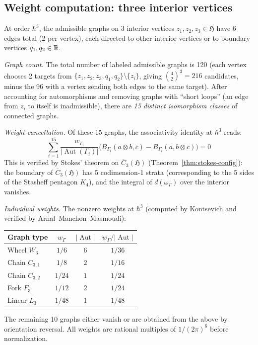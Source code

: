 \subsection{Weight computation: three interior vertices}
\label{subsec:kontsevich-3vertex}

\begin{computation}
\label{comp:kontsevich-3vertex}

At order $\hbar^3$, the admissible graphs on 3 interior vertices
$z_1, z_2, z_3 \in \mathfrak{H}$ have 6 edges total (2 per vertex),
each directed to other interior vertices or to boundary vertices
$q_1, q_2 \in \mathbb{R}$.

\emph{Graph count.}
The total number of labeled admissible graphs is 120 (each vertex
chooses 2 targets from $\{z_1, z_2, z_3, q_1, q_2\}
\setminus \{z_i\}$, giving $\binom{4}{2}^3 = 216$ candidates,
minus the 96 with a vertex sending both edges to the same target).
After accounting for automorphisms and removing graphs with
``short loops'' (an edge from $z_i$ to itself is inadmissible),
there are \emph{15 distinct isomorphism classes} of connected graphs.

\emph{Weight cancellation.}
Of these 15 graphs, the associativity identity at $\hbar^3$ reads:
\begin{equation}\label{eq:hbar3-assoc}
\sum_{i=1}^{15}
\frac{w_{\Gamma_i}}{|\operatorname{Aut}(\Gamma_i)|}
\bigl(B_{\Gamma_i}(a \otimes b, c)
- B_{\Gamma_i}(a, b \otimes c)\bigr) = 0
\end{equation}
This is verified by Stokes' theorem on $\overline{C}_3(\mathfrak{H})$
(Theorem~\ref{thm:stokes-config}): the boundary of
$\overline{C}_3(\mathfrak{H})$ has 5 codimension-1 strata
(corresponding to the 5 sides of the Stasheff pentagon $K_4$),
and the integral of $d(\omega_\Gamma)$ over the interior vanishes.

\emph{Individual weights.}
The nonzero weights at $\hbar^3$ (computed by Kontsevich and
verified by Arnal--Manchon--Masmoudi):
\begin{center}
\renewcommand{\arraystretch}{1.2}
\begin{tabular}{l|ccc}
Graph type & $w_\Gamma$ & $|\operatorname{Aut}|$ &
$w_\Gamma/|\operatorname{Aut}|$ \\
\hline
Wheel $W_3$ & $1/6$ & $6$ & $1/36$ \\
Chain $C_{3,1}$ & $1/8$ & $2$ & $1/16$ \\
Chain $C_{3,2}$ & $1/24$ & $1$ & $1/24$ \\
Fork $F_3$ & $1/12$ & $2$ & $1/24$ \\
Linear $L_3$ & $1/48$ & $1$ & $1/48$
\end{tabular}
\end{center}
The remaining 10 graphs either vanish or are obtained from the above
by orientation reversal.  All weights are rational multiples of
$1/(2\pi)^6$ before normalization.
\end{computation}

